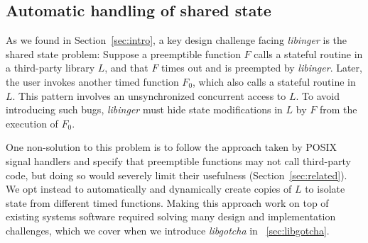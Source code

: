 \subsection{Automatic handling of shared state}
\label{sec:libinger:reentrancy}

As we found in Section~\ref{sec:intro}, a key design challenge facing
\textit{libinger} is the shared state problem:  Suppose a preemptible function
$F$ calls a stateful routine in a third-party library $L$, and
that $F$ times out and is preempted by \textit{libinger}.  Later, the
user invokes another timed function $F_0$, which also calls a stateful
routine in $L$.  This pattern involves an unsynchronized concurrent access to $L$.
To avoid introducing such bugs, \textit{libinger} must hide state modifications in
$L$ by $F$ from the execution of $F_0$.

One non-solution to this problem is to follow the approach taken by POSIX signal
handlers and specify that preemptible functions may not
call third-party code, but doing so would
severely limit their usefulness (Section~\ref{sec:related}).  We opt instead
to automatically and dynamically create copies of $L$ to
isolate state from different timed functions.  Making this approach work on top of
existing systems software required solving many
design and implementation challenges, which we cover when we introduce
\textit{libgotcha} in \Chap~\ref{sec:libgotcha}.
